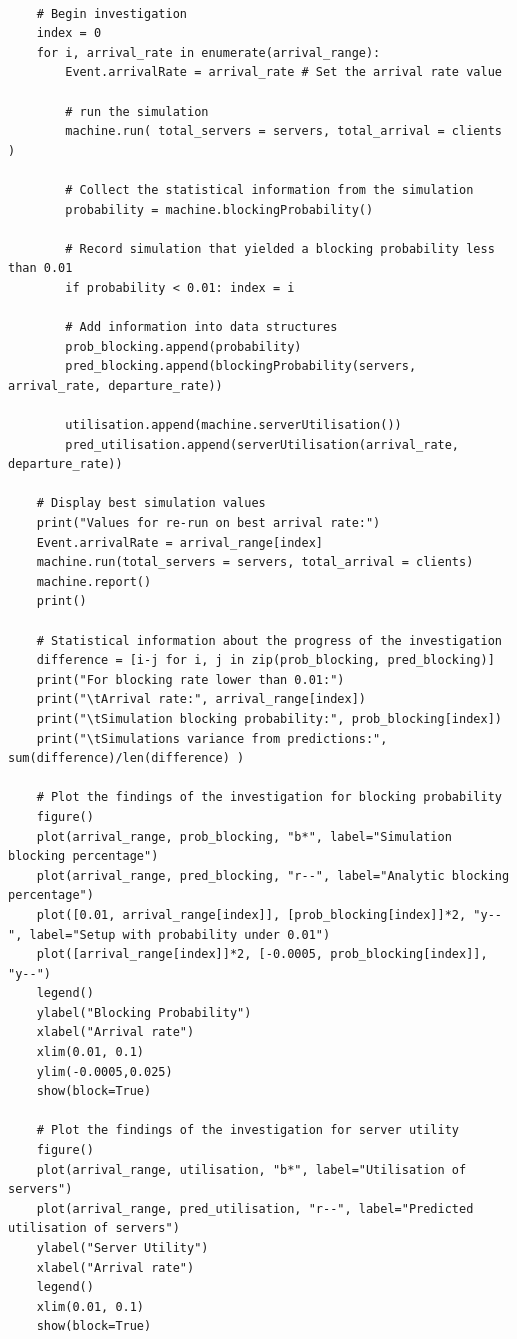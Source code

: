 \documentclass{ecmm427_assignment}
\begin{document}
\begin{verbatim}
    
    # Begin investigation
    index = 0 
    for i, arrival_rate in enumerate(arrival_range):
        Event.arrivalRate = arrival_rate # Set the arrival rate value

        # run the simulation 
        machine.run( total_servers = servers, total_arrival = clients )        

        # Collect the statistical information from the simulation
        probability = machine.blockingProbability()
        
        # Record simulation that yielded a blocking probability less than 0.01
        if probability < 0.01: index = i

        # Add information into data structures
        prob_blocking.append(probability)
        pred_blocking.append(blockingProbability(servers, arrival_rate, departure_rate))

        utilisation.append(machine.serverUtilisation())
        pred_utilisation.append(serverUtilisation(arrival_rate, departure_rate))

    # Display best simulation values
    print("Values for re-run on best arrival rate:")
    Event.arrivalRate = arrival_range[index]
    machine.run(total_servers = servers, total_arrival = clients)
    machine.report()
    print()

    # Statistical information about the progress of the investigation
    difference = [i-j for i, j in zip(prob_blocking, pred_blocking)]
    print("For blocking rate lower than 0.01:")
    print("\tArrival rate:", arrival_range[index])
    print("\tSimulation blocking probability:", prob_blocking[index])
    print("\tSimulations variance from predictions:", sum(difference)/len(difference) )

    # Plot the findings of the investigation for blocking probability
    figure()
    plot(arrival_range, prob_blocking, "b*", label="Simulation blocking percentage")
    plot(arrival_range, pred_blocking, "r--", label="Analytic blocking percentage")
    plot([0.01, arrival_range[index]], [prob_blocking[index]]*2, "y--", label="Setup with probability under 0.01")
    plot([arrival_range[index]]*2, [-0.0005, prob_blocking[index]], "y--")
    legend()
    ylabel("Blocking Probability")
    xlabel("Arrival rate")
    xlim(0.01, 0.1)
    ylim(-0.0005,0.025)
    show(block=True)

    # Plot the findings of the investigation for server utility
    figure()
    plot(arrival_range, utilisation, "b*", label="Utilisation of servers")
    plot(arrival_range, pred_utilisation, "r--", label="Predicted utilisation of servers")
    ylabel("Server Utility")
    xlabel("Arrival rate")
    legend()
    xlim(0.01, 0.1)
    show(block=True)
\end{verbatim}
\end{document}
